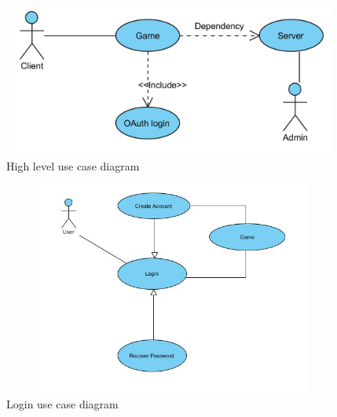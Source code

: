 \documentclass[letterpaper]{article}
\begin{document}
		\section*{\colorbox{black}{}} 
		
		\vspace{0.2in}
		
		\begin{figure}[ht!]
		\centering
		\includegraphics[width=180mm, height=50mm]{UML_Diagram/Use_Case/High_Level}
		\caption{High level use case diagram}
		\label{overflow}
		\end{figure}
		
		\begin{figure}[H]
		\centering
		\includegraphics[width=180mm, height=70mm]{UML_Diagram/Use_Case/login_simple}
		\caption{Login use case diagram}
		\label{overflow}
		\end{figure}		
				
		\vspace{0.2in}
		
		\section*{\colorbox{black}{}} 
				
\end{document}
